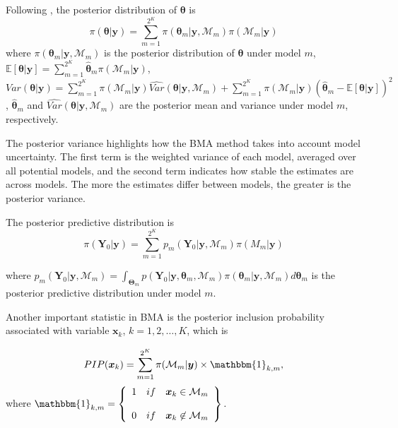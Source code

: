 Following \cite{Raftery93}, the posterior distribution of $\bm{\theta}$ is 
\begin{equation*}
	\pi(\bm{\theta}|\bm{y})= \sum_{m=1}^{2^K}\pi(\bm{\theta}_m|\bm{y},\mathcal{M}_m) \pi(\mathcal{M}_m|\bm{y})
\end{equation*}
where $\pi(\bm{\theta}_m|\bm{y},\mathcal{M}_m)$ is the posterior distribution of $\bm{\theta}$ under model $m$, $\mathbb{E}[\bm{\theta}|\bm{y}]=\sum_{m=1}^{2^K}\hat{\bm{\theta}}_m \pi(\mathcal{M}_m|\bm{y})$, $Var(\bm{\theta}|\bm{y})= \sum_{m=1}^{2^K}\pi(\mathcal{M}_m|\bm{y}) \widehat{Var} (\bm{\theta}|\bm{y},\mathcal{M}_m)+\sum_{m=1}^{2^K} \pi(\mathcal{M}_m|\bm{y}) (\hat{\bm{\theta}}_m-\mathbb{E}[\bm{\theta}|\bm{y}])^2$, $\hat{\bm{\theta}}_m$ and $\widehat{Var}(\bm{\theta}|\bm{y},\mathcal{M}_m)$ are the posterior mean and variance under model $m$, respectively.

The posterior variance highlights how the BMA method takes into account
model uncertainty. The first term is the weighted variance of each model, averaged over all potential models, and the second term indicates how stable the estimates are across models. The more the estimates differ between models, the greater is the posterior variance.

The posterior predictive distribution is
\begin{equation*}
	\pi(\bm{Y}_0|\bm{y})= \sum_{m=1}^{2^K}p_m(\bm{Y}_0|\bm{y},\mathcal{M}_m) \pi(M_m|\bm{y})
\end{equation*}

where $p_m(\bm{Y}_0|\bm{y},\mathcal{M}_m)=\int_{\bm{\Theta}_m} p(\bm{Y}_0|\bm{y},\bm{\theta}_m,\mathcal{M}_m)\pi(\bm{\theta}_m |\bm{y}, \mathcal{M}_m) d\bm{\theta}_{m}$ is the posterior predictive distribution under model $m$. 

Another important statistic in BMA is the posterior inclusion probability associated with variable $\bm{x}_k$, $k=1,2,\dots,K$, which is

\begin{equation*}
	PIP(\bm{x}_k)=\sum_{m=1}^{2^K}\pi(\mathcal{M}_m|\bm{y})\times \mathbbm{1}_{k,m},
\end{equation*}
where
$\mathbbm{1}_{k,m}= \left\{ \begin{array}{lcc}
	1&   if  & \bm{x}_{k}\in \mathcal{M}_m \\
	\\ 0 &  if & \bm{x}_{k}\not \in \mathcal{M}_m
\end{array}
\right\}.$\\

